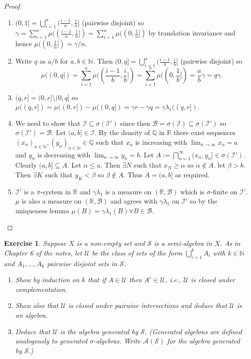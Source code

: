 \documentclass{article}
\newtheorem{exercise}[theorem]{Exercise}
\begin{document}
\begin{proof}
\begin{enumerate}
    \item[(a)] $(0,1]=\bigcup_{i=1}^n(\frac{i-1}{n},\frac{i}{n}]$ (pairwise disjoint) so $\gamma=\sum_{i=1}^n\mu((\frac{i-1}{n},\frac{i}{n}])=\sum_{i=1}^n\mu((0,\frac{1}{n}])$ by translation invariance and hence $\mu((0,\frac{1}{n}])=\gamma/n$.
    \item[(b)] Write $q$ as $a/b$ for $a,b\in\mathbb{N}$. Then $(0,q]=\bigcup_{i=1}^a(\frac{i-1}{b},\frac{i}{b}]$ (pairwise disjoint) so \[\mu((0,q])=\sum_{i=1}^a\mu((\frac{i-1}{b},\frac{i}{b}])=\sum_{i=1}^a\mu((0,\frac{1}{b}])=\frac{a}{b}\gamma=q\gamma.\]
    \item[(c)] $(q,r]=(0,r]\setminus(0,q]$ so $\mu((q,r])=\mu((0,r])-\mu((0,q])=\gamma r-\gamma q=\gamma\lambda_1((q,r])$.
\item[(d)] We need to show that $\mathcal{I}\subseteq\sigma(\mathcal{I}')$ since then $\mathcal{B}=\sigma(\mathcal{I})\subseteq\sigma(\mathcal{I}')$ so $\sigma(\mathcal{I}')=\mathcal{B}$. Let $(a,b]\in\mathcal{I}$. By the density of $\mathbb{Q}$ in $\mathbb{R}$ there exist sequences $(x_n)_{n\in\mathbb{N}},(y_n)_{n\in\mathbb{N}}\in\mathbb{Q}$ such that $x_n$ is increasing with $\lim_{n\to\infty}x_n=a$ and $y_n$ is decreasing with $\lim_{n\to\infty}y_n=b$. Let $A:=\bigcap_{n=1}^\infty(x_n,y_n]\in\sigma(\mathcal{I}')$. Clearly $(a,b]\subseteq A$. Let $\alpha\leq a$. Then $\exists N$ such that $x_N\geq\alpha$ so $\alpha\not\in A$. let $\beta>b$. Then $\exists K$ such that $y_K<\beta$ so $\beta\not\in A$. Thus $A=(a,b]$ as required.
\item[(e)] $\mathcal{I}'$ is a $\pi$-system in $\mathbb{R}$ and $\gamma\lambda_1$ is a measure on $(\mathbb{R},\mathcal{B})$ which is $\sigma$-finite on $\mathcal{I}'$. $\mu$ is also a measure on $(\mathbb{R},\mathcal{B})$ and agrees with $\gamma\lambda_1$ on $\mathcal{I}'$ so by the uniqueness lemma $\mu(B)=\gamma\lambda_1(B)\forall B\in\mathcal{B}$.
\end{enumerate}
\end{proof}
\begin{exercise}
    Suppose $X$ is a non-empty set and $\mathcal{S}$ is a semi-algebra in $X$. As in Chapter 6 of the notes, let $\mathcal{U}$ be the class of sets of the form $\bigcup_{i=1}^k A_i$ with $k \in \mathbb{N}$ and $A_1, \dots, A_k$ pairwise disjoint sets in $\mathcal{S}$.
    \begin{enumerate}
        \item[(a)] Show by induction on $k$ that if $A \in \mathcal{U}$ then $A^c \in \mathcal{U}$, i.e., $\mathcal{U}$ is closed under complementation.
        \item[(b)] Show also that $\mathcal{U}$ is closed under pairwise intersections and deduce that $\mathcal{U}$ is an algebra.
        \item[(c)] Deduce that $\mathcal{U}$ is the algebra generated by $\mathcal{S}$. (Generated algebras are defined analogously to generated $\sigma$-algebras. Write $\mathcal{A}(\mathcal{S})$ for the algebra generated by $\mathcal{S}$.)
    \end{enumerate}
\end{exercise}
\end{document}

